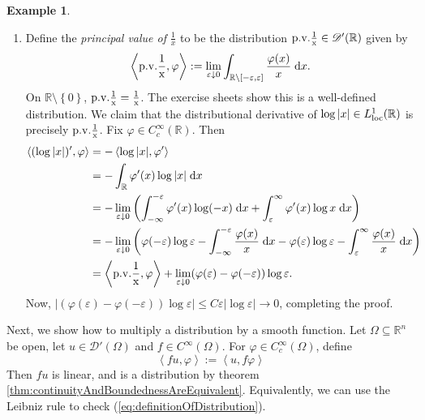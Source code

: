 \documentclass{book}
\newcommand{\scrD}{\mathscr{D}}
\newcommand{\bbR}{\mathbb{R}}
\renewcommand{\d}{\mathrm{d}}
\renewcommand{\epsilon}{\varepsilon}
\renewcommand{\phi}{\varphi}
\newcommand{\abs}[1]{\left\lvert {#1} \right\rvert}
\newcommand{\set}[1]{\left\{ {#1} \right\}}
\newcommand{\angles}[1]{\left\langle {#1} \right\rangle}
\newcommand{\parens}[1]{\left( {#1} \right)}
\theoremstyle{definition}
\newtheorem{example}[theorem]{Example}
\theoremstyle{remark}
\numberwithin{equation}{chapter}
\begin{document}
\begin{example}
\begin{enumerate}[label=(\arabic*)]
        \item Define the \textit{principal value of} $\frac{1}{x}$ to be the distribution $\rm{p.v.} \frac{1}{x} \in \scrD'(\bbR)$ given by 
        \begin{equation}
            \angles{ \rm{p.v.}\frac{1}{x},\phi } := \lim_{\epsilon \downarrow 0} \int_{\bbR \setminus [-\epsilon,\epsilon]} \frac{\phi(x)}{x} \; \d x.
        \end{equation}
        On $\bbR \setminus \set{0}$, $\rm{p.v.} \frac{1}{x} = \frac{1}{x}$. The exercise sheets show this is a well-defined distribution. We claim that the distributional derivative of $\log{\abs{x}} \in L_{\rm loc}^1(\bbR)$ is precisely $\rm{p.v.}\frac{1}{x}$. Fix $\phi \in C_c^\infty(\bbR)$. Then
        \begin{equation} \begin{aligned}
            \angles{ (\log{\abs{x}})',\phi } &= - \angles{ \log{\abs{x}},\phi' }                                                   \\
                                             &= - \int_\bbR \phi'(x) \log{\abs{x}} \; \d x                                         \\
                                             &= - \lim_{\epsilon \downarrow 0} \parens{ \int_{-\infty}^{-\epsilon} \phi'(x) \log(-x) \; \d x 
                                                + \int_\epsilon^\infty \phi'(x) \log{x} \; \d x }                                  \\
                                             &= - \lim_{\epsilon \downarrow 0} \parens{ \phi(-\epsilon)\log{\epsilon} - \int_{-\infty}^{-\epsilon} \frac{\phi(x)}{x} \; \d x 
                                                - \phi(\epsilon)\log{\epsilon} - \int_\epsilon^\infty \frac{\phi(x)}{x} \; \d x }  \\
                                             &= \angles{ \rm{p.v.}\frac{1}{x},\phi } 
                                                + \lim_{\epsilon \downarrow 0} (\phi(\epsilon) - \phi(-\epsilon))\log{\epsilon}.
        \end{aligned} \end{equation}
        Now, $\abs{ (\phi(\epsilon) - \phi(-\epsilon))\log{\epsilon} } \leq C\epsilon\abs{ \log{\epsilon} } \rightarrow 0$, completing the proof.
    \end{enumerate}
\end{example}
        
Next, we show how to multiply a distribution by a smooth function. Let $\Omega \subseteq \bbR^n$ be open, let $u \in \scrD'(\Omega)$ and $f \in C^\infty(\Omega)$. For $\phi \in C_c^\infty(\Omega)$, define 
\begin{equation}
    \angles{ fu,\phi } := \angles{ u, f\phi }
\end{equation}
Then $fu$ is linear, and is a distribution by theorem \ref{thm:continuityAndBoundednessAreEquivalent}. Equivalently, we can use the Leibniz rule to check (\ref{eq:definitionOfDistribution}).
\end{document}
